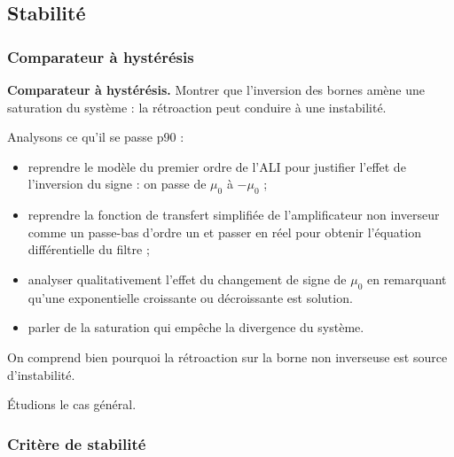 \subsection{Stabilité}

\subsubsection{Comparateur à hystérésis}

\begin{experience}
\textbf{Comparateur à hystérésis.}
Montrer que l'inversion des bornes amène une saturation du système : la rétroaction peut conduire à une instabilité.
\end{experience}

Analysons ce qu'il se passe \cite{Neveu2019a} p90 :
\begin{itemize}
\item reprendre le modèle du premier ordre de l'ALI pour justifier l'effet de l'inversion du signe : on passe de $\mu_0$ à $-\mu_0$ ;
\item reprendre la fonction de transfert simplifiée de l'amplificateur non inverseur comme un passe-bas d'ordre un et passer en réel pour obtenir l'équation différentielle du filtre ;
\item analyser qualitativement l'effet du changement de signe de $\mu_0$ en remarquant qu'une exponentielle croissante ou décroissante est solution.
\item parler de la saturation qui empêche la divergence du système.
\end{itemize}
On comprend bien pourquoi la rétroaction sur la borne non inverseuse est source d'instabilité.

\begin{transition}
Étudions le cas général.
\end{transition}

\subsubsection{Critère de stabilité}

